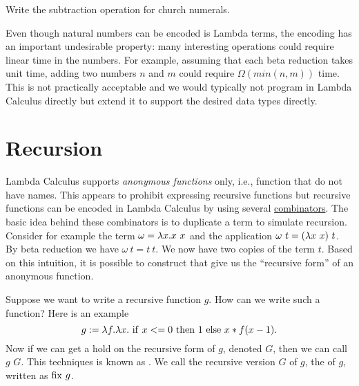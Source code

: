 \begin{exercise}
\label{xrcs:lcc:church-numerals::subtract}
Write the subtraction operation for church numerals.
\end{exercise}

\begin{remark}
\label{rmrk:lcc:church-numerals::cost}
Even though natural numbers can be encoded is Lambda terms, the encoding has an important undesirable property: many interesting operations could require linear time in the numbers.  
%
For example, assuming that each beta reduction takes unit time, adding
two numbers $n$ and $m$ could require $\Omega(min(n,m))$ time.
%
This is not practically acceptable and we would typically not program in Lambda Calculus directly but extend it to support the desired data types directly.
\end{remark}

\section{Recursion}
\label{sec:lcc:recursion}

\begin{gram}
\label{grm:lcc:recursion::intro}
Lambda Calculus supports {\em anonymous functions} only, i.e.,
function that do not have names.  
%
This appears to prohibit expressing recursive functions but recursive functions can be encoded in Lambda Calculus by using several 
\href{def:lcs::open-closed}{combinators}.
%
The basic idea behind these combinators is to duplicate a term to simulate recursion.
%
Consider for example the term $\omega = \lambda x. x~x$ and the application
$\omega~ t = (\lambda x~ x)~ t $.  
%
By beta reduction we have $\omega~ t =
t~ t $.  We now have two copies of the term $t$.  Based on this
intuition, it is possible to construct 
that give us the ``recursive form'' of an anonymous function.
\end{gram}

\begin{gram}
\label{grm:lcc:recursion::open}
Suppose we want to write a recursive function $g$.  How can we
write such a function?  Here is an example
\[
g   := \lambda f. \lambda x.~\mathrm{if}~x <= 0~\mathrm{then}~1~\mathrm{else}~x*f (x-1). 
\]
Now if we can get a hold on the recursive form of $g$, denoted $G$, then we can call $g$ $G$.
%
This techniques is known as .
%
%
We call the recursive version $G$ of $g$, the  of $g$,
written as $\mathrm{fix}~g$.
\end{gram}

